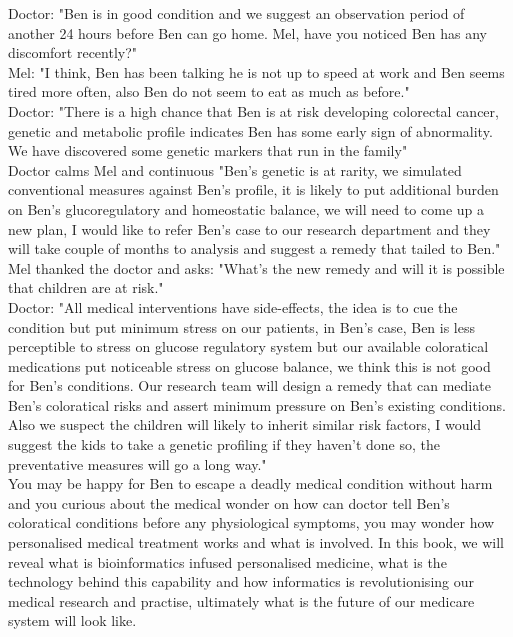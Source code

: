 Doctor: "Ben is in good condition and we suggest an observation period of another 24 hours before Ben can go home. Mel, have you noticed Ben has any discomfort recently?" \\
Mel: "I think, Ben has been talking he is not up to speed at work and Ben seems tired more often, also Ben do not seem to eat as much as before." \\
Doctor: "There is a high chance that Ben is at risk developing colorectal cancer, genetic and metabolic profile indicates Ben has some early sign of abnormality. We have discovered some genetic markers that run in the family" \\
Doctor calms Mel and continuous "Ben's genetic is at rarity, we simulated conventional measures against Ben's profile, it is likely to put additional burden on Ben's glucoregulatory and homeostatic balance, we will need to come up a new plan, I would like to refer Ben's case to our research department and they will take couple of months to analysis and suggest a remedy that tailed to Ben." \\
Mel thanked the doctor and asks: "What's the new remedy and will it is possible that children are at risk." \\
Doctor: "All medical interventions have side-effects, the idea is to cue the condition but put minimum stress on our patients, in Ben's case, Ben is less perceptible to stress on glucose regulatory system but our available coloratical medications put noticeable stress on glucose balance, we think this is not good for Ben's conditions. Our research team will design a remedy that can mediate Ben's coloratical risks and assert minimum pressure on Ben's existing conditions. Also we suspect the children will likely to inherit similar risk factors, I would suggest the kids to take a genetic profiling if they haven't done so, the preventative measures will go a long way." \\
You may be happy for Ben to escape a deadly medical condition without harm and you curious about the medical wonder on how can doctor tell Ben's coloratical conditions before any physiological symptoms, you may wonder how personalised medical treatment works and what is involved. In this book, we will reveal what is bioinformatics infused personalised medicine, what is the technology behind this capability and how informatics is revolutionising our medical research and practise, ultimately what is the future of our medicare system will look like.